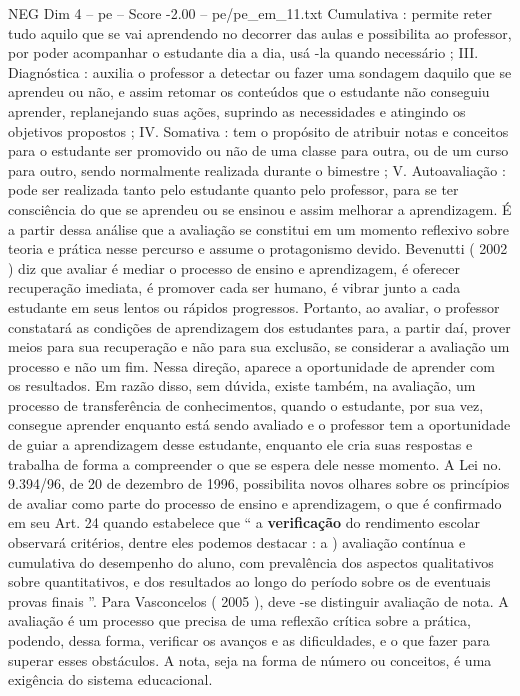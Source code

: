 \begin{textsample}{NEG Dim 4 – pe – Score -2.00 – pe/pe\_em\_11.txt}
Cumulativa : permite reter tudo aquilo que se vai aprendendo no decorrer das aulas e possibilita ao professor, por poder acompanhar o estudante dia a dia, usá -la quando necessário ; III.
Diagnóstica : auxilia o professor a detectar ou fazer uma sondagem daquilo que se aprendeu ou não, e assim retomar os conteúdos que o estudante não conseguiu aprender, replanejando suas ações, suprindo as necessidades e atingindo os objetivos propostos ; IV.
Somativa : tem o propósito de atribuir notas e conceitos para o estudante ser promovido ou não de uma classe para outra, ou de um curso para outro, sendo normalmente realizada durante o bimestre ; V.
Autoavaliação : pode ser realizada tanto pelo estudante quanto pelo professor, para se ter consciência do que se aprendeu ou se ensinou e assim melhorar a aprendizagem.
É a partir dessa análise que a avaliação se constitui em um momento reflexivo sobre teoria e prática nesse percurso e assume o protagonismo devido.
Bevenutti ( 2002 ) diz que avaliar é mediar o processo de ensino e aprendizagem, é oferecer recuperação imediata, é promover cada ser humano, é vibrar junto a cada estudante em seus lentos ou rápidos progressos.
Portanto, ao avaliar, o professor constatará as condições de aprendizagem dos estudantes para, a partir daí, prover meios para sua recuperação e não para sua exclusão, se considerar a avaliação um processo e não um fim.
Nessa direção, aparece a oportunidade de aprender com os resultados.
Em razão disso, sem dúvida, existe também, na avaliação, um processo de transferência de conhecimentos, quando o estudante, por sua vez, consegue aprender enquanto está sendo avaliado e o professor tem a oportunidade de guiar a aprendizagem desse estudante, enquanto ele cria suas respostas e trabalha de forma a compreender o que se espera dele nesse momento.
A Lei no. 9.394/96, de 20 de dezembro de 1996, possibilita novos olhares sobre os princípios de avaliar como parte do processo de ensino e aprendizagem, o que é confirmado em seu Art. 24 quando estabelece que “ a \textbf{verificação} do rendimento escolar observará critérios, dentre eles podemos destacar : a ) avaliação contínua e cumulativa do desempenho do aluno, com prevalência dos aspectos qualitativos sobre quantitativos, e dos resultados ao longo do período sobre os de eventuais provas finais ”.
Para Vasconcelos ( 2005 ), deve -se distinguir avaliação de nota.
A avaliação é um processo que precisa de uma reflexão crítica sobre a prática, podendo, dessa forma, verificar os avanços e as dificuldades, e o que fazer para superar esses obstáculos.
A nota, seja na forma de número ou conceitos, é uma exigência do sistema educacional.

\end{textsample}
